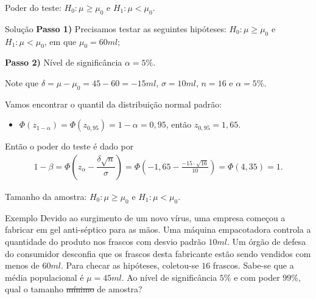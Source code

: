 \documentclass[8pt]{beamer}
\begin{document}
\begin{frame}{Poder do teste: $H_0:\mu \geq \mu_0$ e $H_1: \mu < \mu_0$.}

\begin{block}{Solução}
	\textbf{Passo 1)} Precisamos testar as seguintes hipóteses: $H_0: \mu \geq \mu_0$ e $H_1:\mu < \mu_0$, em que $\mu_0=60ml$;

	\textbf{Passo 2)} Nível de significância $\alpha=5\%$.
	
	Note que $\delta=\mu-\mu_0=45-60=-15ml$, $\sigma=10ml$, $n=16$ e $\alpha=5\%$.
	
	Vamos encontrar o quantil da distribuição normal padrão:
	\begin{itemize}
		\item $\Phi\left( z_{1-\alpha} \right)=\Phi\left( z_{0,95} \right) =1- \alpha = 0,95$, então $z_{0,95} = 1,65$.
	\end{itemize} 
	
	Então o poder do teste é dado por
	\begin{align*}
	1 - \beta = \Phi\left(z_\alpha - \dfrac{\delta \sqrt{n}}{\sigma}\right) = \Phi \left( -1,65 - \frac{-15\cdot \sqrt{16}}{10} \right) = \Phi \left(4,35\right) =1.
	\end{align*}
\end{block}

\end{frame}

\begin{frame}{Tamanho da amostra: $H_0:\mu \geq \mu_0$ e $H_1: \mu < \mu_0$.}

\large

\begin{block}{Exemplo}
	Devido ao surgimento de um novo vírus, uma empresa começou a fabricar em gel anti-séptico para as mãos. Uma máquina empacotadora controla a quantidade do produto nos frascos com desvio padrão $10ml$.
	Um órgão de defesa do consumidor desconfia que os frascos desta fabricante estão sendo vendidos com menos de $60ml$.
	Para checar as hipóteses, coletou-se $16$ frascos. Sabe-se que a média populacional é $\mu = 45ml$. Ao nível de significância $5\%$ e com poder $99\%$, qual o tamanho \sout{mínimo} de amostra?
\end{block}


\normalsize

\end{frame}
\end{document}

